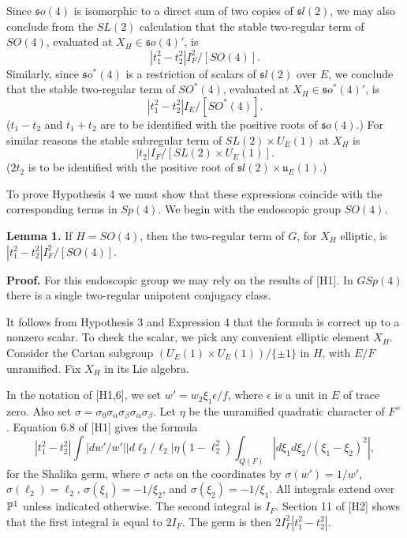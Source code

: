 \documentclass{amsart}
\begin{document}
Since ${\mathfrak so}(4)$ is isomorphic to a direct sum of
two copies of ${\mathfrak sl}(2)$, we may also conclude from
the $SL(2)$ calculation that
the stable two-regular term of $SO(4)$, evaluated at
$X_H\in {\mathfrak so}(4) '$, is
\begin{equation}
|t_1^2 -t_2^2| I_F^2/[SO(4)].
\end{equation}
Similarly, since ${\mathfrak so}^*(4)$ is a restriction of
scalars of ${\mathfrak sl}(2)$ over $E$, we conclude that the
stable
two-regular term of $SO^*(4)$, evaluated at 
$X_H\in {\mathfrak so}^*(4)'$,
is
\begin{equation}
|t_1^2 -t_2^2| I_E/[SO^*(4)].
\end{equation}
($t_1-t_2$ and $t_1+t_2$ are to be identified with the
positive roots of ${\mathfrak so}(4)$.)
For similar reasons the stable subregular term of
$SL(2)\times U_E(1)$ at $X_H$ is
\begin{equation}
|t_2| I_F/[SL(2)\times U_E(1)].
\end{equation}
($2t_2$ is to be identified with the positive root of ${\mathfrak sl}(2)
\times {\mathfrak u}_E(1)$.)

To prove Hypothesis 4 we must show that these expressions
coincide with the corresponding terms in $Sp(4)$.
We begin with the endoscopic group $SO(4)$.

{\bf Lemma 1.}  If $H=SO(4)$, then the two-regular term of
$G$, for $X_H$ elliptic, is
$|t_1^2 -t_2^2| I_F^2/[SO(4)]$.

{\bf Proof.}   For
this endoscopic
group we may rely
on the results of [H1].  In $GSp(4)$ there is a single
two-regular unipotent conjugacy class.  

It follows from Hypothesis 3 and Expression 4 that the formula is
correct up to a nonzero scalar. To check the scalar,
we pick any convenient elliptic element $X_H$.
Consider the Cartan subgroup $(U_E(1)\times U_E(1))/\{\pm1\}$ 
in $H$,
with $E/F$ unramified. Fix $X_H$ in its Lie algebra.

In the notation of [H1,6], we set
$w' = w_2 \xi_1 \epsilon/f$, where $\epsilon$ is a unit in $E$ of
trace zero.  Also set $\sigma = \sigma_0\sigma_\alpha\sigma_\beta
\sigma_\alpha\sigma_\beta$.  Let
$\eta$ be the unramified quadratic character of $F^\times$.
Equation 6.8 of [H1] gives the
formula
$$|t_1^2 -t_2^2| \int |dw'/w'| |d \ell_2/\ell_2| \eta(1-\ell_2^2)
\int_{Q(F)} |d\xi_1 d\xi_2/(\xi_1-\xi_2)^2|,$$
for the Shalika germ, where $\sigma$ acts on the coordinates
by $\sigma(w')=1/w'$, $\sigma(\ell_2)= \ell_2$, $\sigma(\xi_1)=-1/\xi_2$,
and $\sigma(\xi_2)=-1/\xi_1$.
All integrals extend over ${\Bbb P}^1$ unless indicated
otherwise. The second integral is $I_F$.
Section 11 of [H2] shows that the
first integral is equal to $2I_F$.
The germ is then $2I_F^2|t_1^2 -t_2^2|$.
\end{document}
